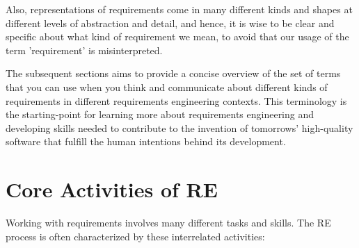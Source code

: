 Also, representations of requirements come in many different kinds and shapes at different levels of abstraction and detail, and hence, it is wise to be clear and specific about what kind of requirement we mean, to avoid that our usage of the term 'requirement' is misinterpreted. 


The subsequent sections aims to provide a concise overview of the set of terms that you can use when you think and communicate about different kinds of requirements in different requirements engineering contexts. This terminology is the starting-point for learning more about requirements engineering and developing skills needed to contribute to the invention of tomorrows' high-quality software that fulfill the human intentions behind its development.

\section{Core Activities of RE}%
\MarginPage{

}%
Working with requirements involves many different tasks and skills. The RE process is often characterized by these interrelated activities: 

